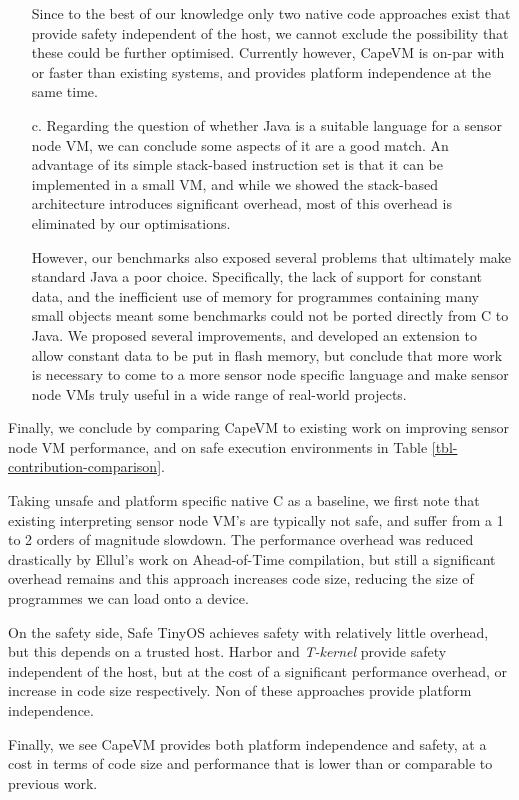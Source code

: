 \begin{enumerate}
	Since to the best of our knowledge only two native code approaches exist that provide safety independent of the host, we cannot exclude the possibility that these could be further optimised. Currently however, CapeVM is on-par with or faster than existing systems, and provides platform independence at the same time.

	\item[c.]
	Regarding the question of whether Java is a suitable language for a sensor node VM, we can conclude some aspects of it are a good match. An advantage of its simple stack-based instruction set is that it can be implemented in a small VM, and while we showed the stack-based architecture introduces significant overhead, most of this overhead is eliminated by our optimisations.
	
	However, our benchmarks also exposed several problems that ultimately make standard Java a poor choice. Specifically, the lack of support for constant data, and the inefficient use of memory for programmes containing many small objects meant some benchmarks could not be ported directly from C to Java. We proposed several improvements, and developed an extension to allow constant data to be put in flash memory, but conclude that more work is necessary to come to a more sensor node specific language and make sensor node VMs truly useful in a wide range of real-world projects.
\end{enumerate}



Finally, we conclude by comparing CapeVM to existing work on improving sensor node VM performance, and on safe execution environments in Table \ref{tbl-contribution-comparison}.

Taking unsafe and platform specific native C as a baseline, we first note that existing interpreting sensor node VM's are typically not safe, and suffer from a 1 to 2 orders of magnitude slowdown. The performance overhead was reduced drastically by Ellul's work on Ahead-of-Time compilation, but still a significant overhead remains and this approach increases code size, reducing the size of programmes we can load onto a device.

On the safety side, Safe TinyOS achieves safety with relatively little overhead, but this depends on a trusted host. Harbor and \emph{T-kernel} provide safety independent of the host, but at the cost of a significant performance overhead, or increase in code size respectively. Non of these approaches provide platform independence.

Finally, we see CapeVM provides both platform independence and safety, at a cost in terms of code size and performance that is lower than or comparable to previous work.

